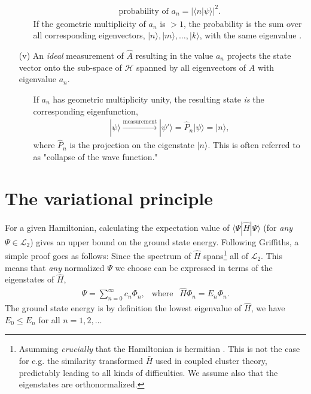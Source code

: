 \documentclass[../../master.tex]{subfiles}
\begin{document}
\begin{itemize}
\begin{itemize}
    \begin{align}
    \text{probability of }a_n = |\langle n|\psi\rangle|^2.
    \end{align}
    If the geometric multiplicity of $a_n$ is $>1$, the probability is the sum over all corresponding eigenvectors, $|n\rangle,|m\rangle,\dots,|k\rangle$, with the same eigenvalue \cite{lay}.
  \end{itemize}
  \item[(v)] An \emph{ideal} measurement of $\hat A$ resulting in the value $a_n$ projects the state vector onto the sub-space of $\mathcal{H}$ spanned by all eigenvectors of $\hat A$ with eigenvalue $a_n$. 
  \begin{itemize}
    \item[] If $a_n$ has geometric multiplicity unity, the resulting state \emph{is} the corresponding eigenfunction,
    \begin{align}
    |\psi\rangle \xrightarrow{\text{measurement}} |\psi'\rangle = \hat P_n |\psi\rangle = |n\rangle,
    \end{align}
    where $\hat P_n$ is the projection on the eigenstate $|n\rangle$. This is often referred to as "collapse of the wave function."
  \end{itemize}
\end{itemize}



\section{The variational principle \label{variational}}
For a given Hamiltonian, calculating the expectation value of $\langle \Psi | \hat H | \Psi\rangle$ (for \emph{any} $\Psi\in\mathcal{L}_2$) gives an upper bound on the ground state energy. Following Griffiths, a simple proof goes as follows: Since the spectrum of $\hat H$ spans\footnote{Asumming \emph{crucially} that the Hamiltonian is hermitian \cite{griffiths}. This is not the case for e.g. the similarity transformed $\bar H$ used in coupled cluster theory, predictably leading to all kinds of difficulties. We assume also that the eigenstates are orthonormalized.} all of $\mathcal{L}_2$. This means that \emph{any} normalized $\Psi$ we choose can be expressed in terms of the eigenstates of $\hat H$,
\begin{align}
\Psi = \sum_{n=0}^\infty c_n \Phi_n, \ \ \text{ where } \ \ \hat H \Phi_n = E_n \Phi_n.
\end{align}
The ground state energy is by definition the lowest eigenvalue of $\hat H$, we have $E_0\le E_n$ for all $n=1,2,\dots$
\end{document}
